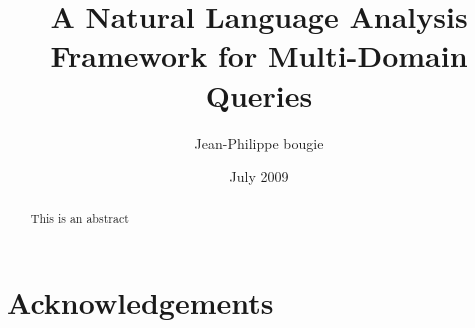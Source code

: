 \documentclass[a4paper]{report}
\begin{document}
\onehalfspacing

\title{A Natural Language Analysis Framework for Multi-Domain Queries}
\author{Jean-Philippe bougie}
\date{July 2009}

\maketitle

\tableofcontents
\listoffigures
\listoftables

\chapter*{Acknowledgements}

\begin{abstract}
  This is an abstract
\end{abstract}














\end{document}
